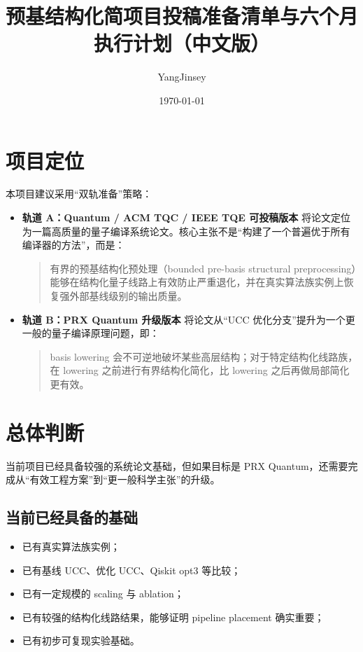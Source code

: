 \documentclass[11pt]{article}
\title{预基结构化简项目投稿准备清单与六个月执行计划（中文版）}
\author{YangJinsey}
\date{\today}
\begin{document}
\maketitle

\section{项目定位}

本项目建议采用“双轨准备”策略：

\begin{itemize}
    \item \textbf{轨道 A：Quantum / ACM TQC / IEEE TQE 可投稿版本}  
    将论文定位为一篇高质量的量子编译系统论文。核心主张不是“构建了一个普遍优于所有编译器的方法”，而是：
    \begin{quote}
    有界的预基结构化预处理（bounded pre-basis structural preprocessing）能够在结构化量子线路上有效防止严重退化，并在真实算法族实例上恢复强外部基线级别的输出质量。
    \end{quote}

    \item \textbf{轨道 B：PRX Quantum 升级版本}  
    将论文从“UCC 优化分支”提升为一个更一般的量子编译原理问题，即：
    \begin{quote}
    basis lowering 会不可逆地破坏某些高层结构；对于特定结构化线路族，在 lowering 之前进行有界结构化简化，比 lowering 之后再做局部简化更有效。
    \end{quote}
\end{itemize}

\section{总体判断}

当前项目已经具备较强的系统论文基础，但如果目标是 PRX Quantum，还需要完成从“有效工程方案”到“更一般科学主张”的升级。

\subsection{当前已经具备的基础}
\begin{itemize}
    \item 已有真实算法族实例；
    \item 已有基线 UCC、优化 UCC、Qiskit opt3 等比较；
    \item 已有一定规模的 scaling 与 ablation；
    \item 已有较强的结构化线路结果，能够证明 pipeline placement 确实重要；
    \item 已有初步可复现实验基础。
\end{itemize}
\end{document}

